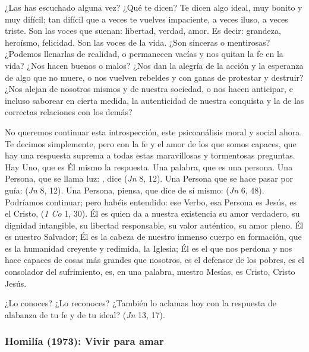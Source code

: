\begin{body}
¿Las has escuchado alguna vez? ¿Qué te dicen? Te dicen algo ideal, muy bonito y muy difícil; tan difícil que a veces te vuelves impaciente, a veces iluso, a veces triste. Son las voces que suenan: libertad, verdad, amor. Es decir: grandeza, heroísmo, felicidad. Son las voces de la vida. ¿Son sinceras o mentirosas? ¿Podemos llenarlas de realidad, o permanecen vacías y nos quitan la fe en la vida? ¿Nos hacen buenos o malos? ¿Nos dan la alegría de la acción y la esperanza de algo que no muere, o nos vuelven rebeldes y con ganas de protestar y destruir? ¿Nos alejan de nosotros mismos y de nuestra sociedad, o nos hacen anticipar, e incluso saborear en cierta medida, la autenticidad de nuestra conquista y la de las correctas relaciones con los demás?

No queremos continuar esta introspección, este psicoanálisis moral y social ahora. Te decimos simplemente, pero con la fe y el amor de los que somos capaces, que hay una respuesta suprema a todas estas maravillosas y tormentosas preguntas. Hay Uno, que es Él mismo la respuesta. Una palabra, que es una persona. Una Persona, que se llama luz: , dice (\textit{Jn} 8, 12). Una Persona que se hace pasar por guía:  (\textit{Jn} 8, 12). Una Persona, piensa, que dice de sí mismo:  (\textit{Jn} 6, 48). Podríamos continuar; pero habéis entendido: ese Verbo, esa Persona es Jesús, es el Cristo,  (\textit{1 Co} 1, 30). Él es quien da a nuestra existencia su amor verdadero, su dignidad intangible, su libertad responsable, su valor auténtico, su amor pleno. Él es nuestro Salvador; Él es la cabeza de nuestro inmenso cuerpo en formación, que es la humanidad creyente y redimida, la Iglesia; Él es el que nos perdona y nos hace capaces de cosas más grandes que nosotros, es el defensor de los pobres, es el consolador del sufrimiento, es, en una palabra, nuestro Mesías, es Cristo, Cristo Jesús.

¿Lo conoces? ¿Lo reconoces? ¿También lo aclamas hoy con la respuesta de alabanza de tu fe y de tu ideal?  (\textit{Jn} 13, 17).
\end{body}

\newpage 
\subsubsection{Homilía (1973): Vivir para amar}

